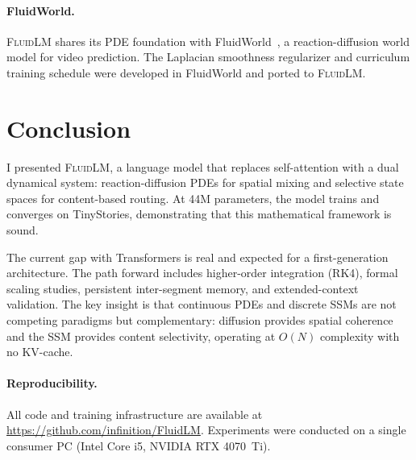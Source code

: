 \documentclass{article}
\newcommand{\fluidlm}{\textsc{FluidLM}}
\begin{document}
\paragraph{FluidWorld.}
\fluidlm{} shares its PDE foundation with FluidWorld~\cite{polly2026fluidworld}, a reaction-diffusion world model for video prediction. The Laplacian smoothness regularizer and curriculum training schedule were developed in FluidWorld and ported to \fluidlm{}.

\section{Conclusion}
\label{sec:conclusion}

I presented \fluidlm{}, a language model that replaces self-attention with a dual dynamical system: reaction-diffusion PDEs for spatial mixing and selective state spaces for content-based routing. At 44M parameters, the model trains and converges on TinyStories, demonstrating that this mathematical framework is sound.

The current gap with Transformers is real and expected for a first-generation architecture. The path forward includes higher-order integration (RK4), formal scaling studies, persistent inter-segment memory, and extended-context validation. The key insight is that continuous PDEs and discrete SSMs are not competing paradigms but complementary: diffusion provides spatial coherence and the SSM provides content selectivity, operating at $O(N)$ complexity with no KV-cache.

\paragraph{Reproducibility.} All code and training infrastructure are available at \url{https://github.com/infinition/FluidLM}. Experiments were conducted on a single consumer PC (Intel Core i5, NVIDIA RTX 4070~Ti).




\end{document}
